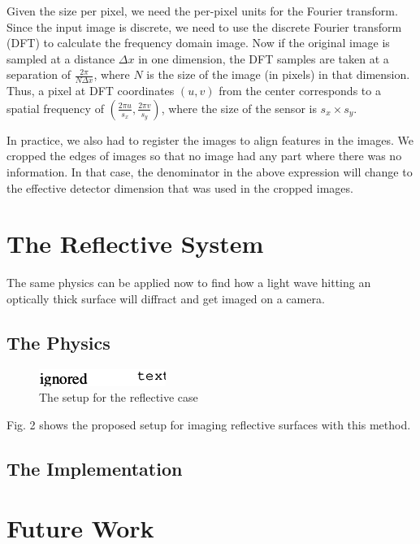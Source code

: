 \documentclass[11pt,a4paper,journal]{IEEEtran}
\begin{document}
Given the size per pixel, we need the per-pixel units for the Fourier transform. Since the input image is discrete, we need to use the discrete Fourier transform (DFT) to calculate the frequency domain image.  Now if the original image is sampled at a distance $\Delta x$ in one dimension, the DFT samples are taken at a separation of $\frac{2\pi}{N\Delta x}$\cite{DFTWiki}, where $N$ is the size of the image (in pixels) in that dimension. Thus, a pixel at DFT coordinates $(u, v)$ from the center corresponds to a spatial frequency of $\left(\frac{2\pi u}{s_x}, \frac{2\pi v}{s_y}\right)$, where the size of the sensor is $s_x \times s_y$.

In practice, we also had to register the images to align features in the images. We cropped the edges of images so that no image had any part where there was no information. In that case, the denominator in the above expression will change to the effective detector dimension that was used in the cropped images.

\section{The Reflective System}
The same physics can be applied now to find how a light wave hitting an optically thick surface will diffract and get imaged on a camera.

\subsection{The Physics}
\begin{figure}
  \caption{The setup for the reflective case}
  \centering
    \includegraphics[scale=1]{fpm_setup_refl}
\end{figure}
Fig. 2 shows the proposed setup for imaging reflective surfaces with this method.

\subsection{The Implementation}

\section{Future Work}
\end{document}
